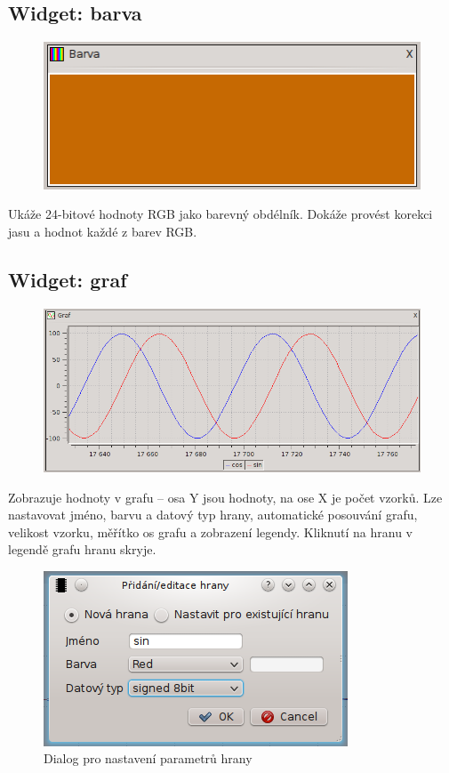 \documentclass[12pt, a4paper, oneside]{article}
\begin{document}
\subsection*{Widget: barva}
\begin{figure}[h]
\begin{center}
\includegraphics{img/w_col.png}
\end{center}
\end{figure}
Ukáže 24-bitové hodnoty RGB jako barevný obdélník. Dokáže provést korekci jasu a hodnot každé z barev RGB.

\newpage
\subsection*{Widget: graf}
\begin{figure}[h]
\begin{center}
\includegraphics[scale=0.65]{img/w_graph.png}
\end{center}
\end{figure}
Zobrazuje hodnoty v grafu -- osa Y jsou hodnoty, na ose X je počet vzorků. Lze nastavovat jméno, barvu a datový typ hrany, automatické posouvání grafu, velikost vzorku, měřítko os grafu a zobrazení legendy. Kliknutí na hranu v legendě grafu hranu skryje.
\begin{figure}[h]
\begin{center}
\includegraphics[scale=0.8]{img/w_graph_add.png}
\caption{Dialog pro nastavení parametrů hrany}
\end{center}
\end{figure}
\end{document}
